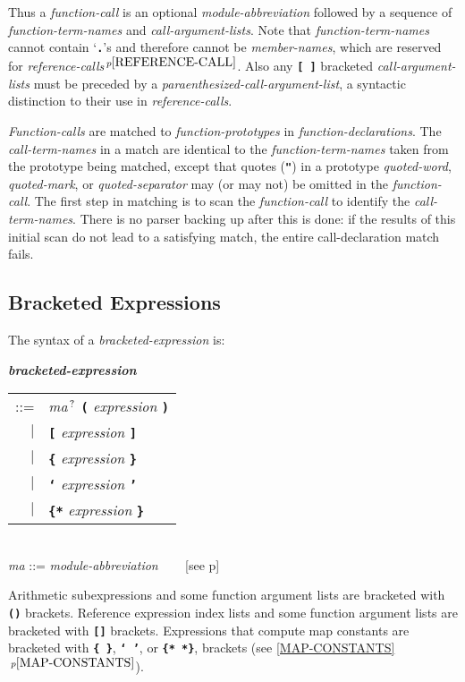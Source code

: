 \documentclass[12pt]{article}
\newcommand{\TT}[1]{{\tt \bfseries #1}}
\newcommand{\QMARK}{{$^{\,\mbox{\footnotesize ?}}$}}
\newcommand{\emkey}[1]{{\em \bfseries #1}}
\newcommand{\itemref}[1]{\ref{#1}$\,^{p\pageref{#1}}$}
\newcommand{\pagref}[1]{p\pageref{#1}}
\newcommand{\pagnote}[1]{$\,^{p\pageref{#1}}$}
\newenvironment{indpar}[1][0.3in]%
	{\begin{list}{}%
		     {\setlength{\itemsep}{0in}%
		      \setlength{\topsep}{0in}%
		      \setlength{\parsep}{1ex}%
		      \setlength{\labelwidth}{#1}%
		      \setlength{\leftmargin}{#1}%
		      \addtolength{\leftmargin}{\labelsep}}%
	 \item}%
	{\end{list}}
\begin{document}
Thus a {\em function-call} is an optional {\em module-abbreviation}
followed by a sequence of {\em function-term-names}
and {\em call-argument-lists}.  Note that {\em function-term-names} cannot
contain `\TT{.}'s and therefore cannot be {\em member-names},
which are reserved for {\em reference-calls}\pagnote{REFERENCE-CALL}.
Also any \TT{[~]} bracketed {\em call-argument-lists} must be preceded by
a {\em paraenthesized-call-argument-list},
a syntactic distinction to their use in {\em reference-calls}.

{\em Function-calls} are matched to {\em function-prototypes} in
{\em function-declarations}.  The
{\em call-term-names} in a match are identical to the
{\em function-term-names} taken from the prototype being matched, except
that quotes (\TT{"}) in a prototype {\em quoted-word}, {\em quoted-mark}, or
{\em quoted-separator} may (or may not) be omitted in the
{\em function-call}.  The first
step in matching is to scan the {\em function-call} to identify the
{\em call-term-names}.  There is no parser backing up after this is
done: if the results of this initial scan do not lead to a satisfying
match, the entire call-declaration match fails.

\subsection{Bracketed Expressions}
\label{BRACKETED-EXPRESSIONS}

The syntax of a {\em bracketed-expression} is:

\begin{indpar}
\emkey{bracketed-expression}\label{BRACKETED-EXPRESSION}
    \begin{tabular}[t]{@{}rl}
    ::= & {\em ma}\QMARK{} \TT{(} {\em expression} \TT{)} \\
    $|$ & \TT{[} {\em expression} \TT{]} \\
    $|$ & \TT{\{} {\em expression} \TT{\}} \\
    $|$ & \TT{`} {\em expression} \TT{'} \\
    $|$ & \TT{\{*} {\em expression} \TT{*\}} \\
    \end{tabular}
\\[0.5ex]
{\em ma} ::= {\em module-abbreviation} ~~~ [see \pagref{MODULE-ABBREVIATION}]
\end{indpar}

Arithmetic subexpressions and some function argument lists are bracketed
with \TT{()} brackets.  Reference expression index lists and some function
argument lists are bracketed with \TT{[]} brackets.
Expressions that compute map constants
are bracketed with \TT{\{~\}}, \TT{`~'}, or \TT{\{*~*\}},
brackets (see \itemref{MAP-CONSTANTS}).
\end{document}
